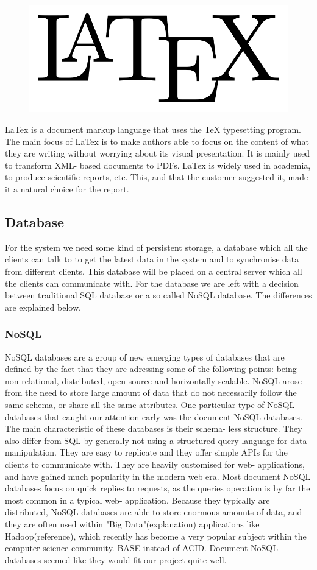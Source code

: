 \begin{figure}
\vspace{-30pt}
\centering
\includegraphics[width = .20\textwidth]{image/latex-logo.png}
\end{figure}

LaTex is a document markup language that uses the TeX typesetting program. The main focus of LaTex is to make authors able to focus on the content of what they are writing without worrying about its visual presentation. It is mainly used to transform XML- based documents to PDFs. LaTex is widely used in academia, to produce scientific reports, etc. This, and that the customer suggested it, made it a natural choice for the report. 

\subsection{Database}
For the system we need some kind of persistent storage, a database which all the clients can talk to to get the latest data in the system and to synchronise data from different clients. This database will be placed on a central server which all the clients can communicate with. For the database we are left with a decision between traditional SQL database or a so called NoSQL database. The differences are explained below.

\subsubsection*{NoSQL}
NoSQL databases are a group of new emerging types of databases that are defined by the fact that they are adressing some of the following points: being non-relational, distributed, open-source and horizontally scalable\cite{nosql}. NoSQL arose from the need to store large amount of data that do not necessarily follow the same schema, or share all the same attributes. One particular type of NoSQL databases that caught our attention early was the document NoSQL databases. The main characteristic of these databases is their schema- less structure. They also differ from SQL by generally not using a structured query language for data manipulation. They are easy to replicate and they offer simple APIs for the clients to communicate with. They are heavily customised for web- applications, and have gained much popularity in the modern web era. Most document NoSQL databases focus on quick replies to requests, as the queries operation is by far the most common in a typical web- application. Because they typically are distributed, NoSQL databases are able to store enormous amounts of data, and they are often used within "Big Data"(explanation) applications like Hadoop(reference), which recently has become a very popular subject within the computer science community. 
BASE \cite{pritchett} instead of ACID. 
Document NoSQL databases seemed like they would fit our project quite well.

